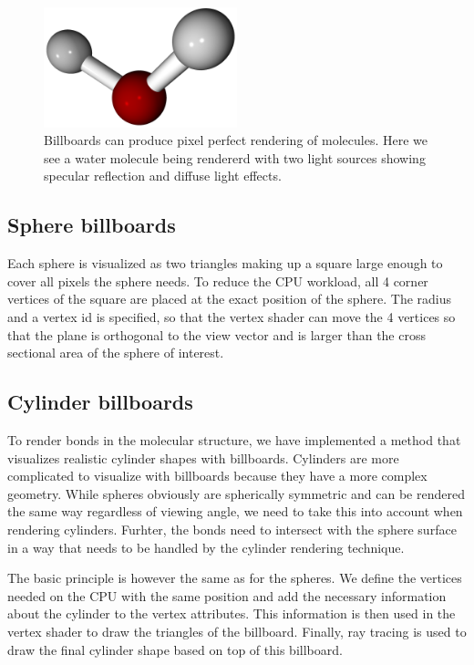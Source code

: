 \documentclass[aps,pre,twocolumn,letterpaper,floatfix,nofootinbib]{revtex4}
\begin{document}
\begin{figure}
	\centering
	\includegraphics[width=0.5\textwidth]{final_billboard.png}
	\caption{Billboards can produce pixel perfect rendering of molecules. Here we see a water molecule being rendererd with two light sources showing specular reflection and diffuse light effects.}
	\label{fig:final_billboards}
\end{figure}

\subsection{Sphere billboards}

Each sphere is visualized as two triangles making up a square large enough to
cover all pixels the sphere needs.
To reduce the CPU workload, all 4 corner vertices of the square are placed at
the exact position of the sphere.
The radius and a vertex id is specified, so that the vertex shader can move the
4 vertices so that the plane is orthogonal to the view vector and is larger than
the cross sectional area of the sphere of interest.

\subsection{Cylinder billboards}
%
To render bonds in the molecular structure, we have implemented a method that
visualizes realistic cylinder shapes with billboards.
Cylinders are more complicated to visualize with billboards because they have a
more complex geometry.
While spheres obviously are spherically symmetric and can be rendered the same
way regardless of viewing angle, we need to take this into account when
rendering cylinders.
Furhter, the bonds need to intersect with the sphere surface in a way that
needs to be handled by the cylinder rendering technique.

The basic principle is however the same as for the spheres.
We define the vertices needed on the CPU with the same position and add the
necessary information about the cylinder to the vertex attributes.
This information is then used in the vertex shader to draw the triangles of
the billboard.
Finally, ray tracing is used to draw the final cylinder shape based on top
of this billboard.
\end{document}
